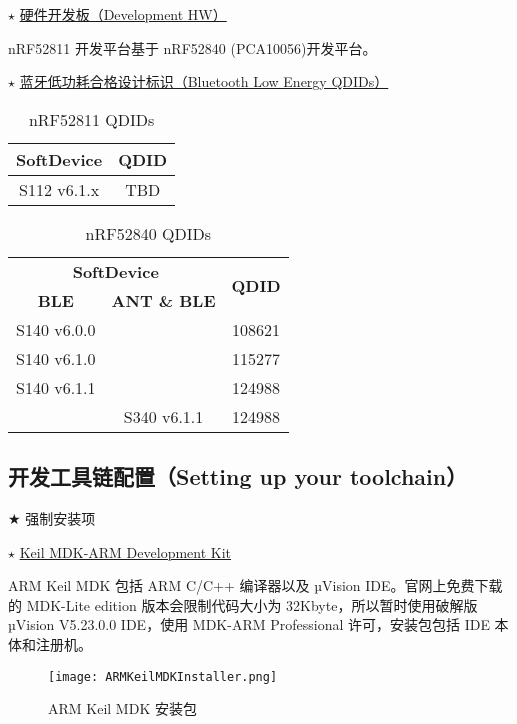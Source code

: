 \documentclass{WHUResearch}  %
\begin{document}
$\star$ \href{https://infocenter.nordicsemi.com/index.jsp?topic=\%2Fcomp_matrix_nrf52811\%2FCOMP\%2Fnrf52811\%2Fnrf52811_ble_qdid_qual_matrix.html&cp=3_2_2_4}{硬件开发板（Development HW）}

 nRF52811 开发平台基于 nRF52840 (PCA10056)开发平台。

$\star$ \href{https://infocenter.nordicsemi.com/index.jsp?topic=\%2Fcomp_matrix_nrf52811\%2FCOMP\%2Fnrf52811\%2Fnrf52811_ble_qdid_qual_matrix.html&cp=3_2_2_4}{蓝牙低功耗合格设计标识（Bluetooth Low Energy QDIDs）}
\begin{table}[htbp]
  \centering
  \caption{nRF52811 QDIDs}
	\begin{tabular}{|c|c|}
	\hline
  	\textbf{SoftDevice	} & \textbf{QDID} \\ \hline
  	S112 v6.1.x   	     & TBD \\ \hline
	\end{tabular}
\end{table}

\begin{table}[htbp]
  \centering
  \caption{nRF52840 QDIDs}
	\begin{tabular}{|c|c|c|}
	\hline
	\multicolumn{2}{|c|}{\textbf{SoftDevice}} & \multirow{2}{*}{\textbf{QDID}} \\ \cline{1-2}
  			 \textbf{BLE} & \textbf{ANT \& BLE} &                   \\ \hline
  			 S140 v6.0.0	& \multirow{3}{*}{}  & 108621 \\ \cline{1-1} \cline{3-3} 
  			 S140 v6.1.0	&                    & 115277 \\ \cline{1-1} \cline{3-3} 
  			 S140 v6.1.1	&                    & 124988 \\ \hline
  							& S340 v6.1.1 		  & 124988 \\ \hline
	\end{tabular}
\end{table}

\subsection{开发工具链配置（Setting up your toolchain）}

$\bigstar$ 强制安装项

$\star$ \href{http://www2.keil.com/mdk5/}{Keil MDK-ARM Development Kit}

ARM Keil MDK 包括 ARM C/C++ 编译器以及 µVision IDE。官网上免费下载的 MDK-Lite edition 版本会限制代码大小为 32Kbyte，所以暂时使用破解版µVision V5.23.0.0 IDE，使用 MDK-ARM Professional 许可，安装包包括 IDE 本体和注册机。
\begin{figure}[htbp]
\centering
  \texttt{[image: ARMKeilMDKInstaller.png]}
  \caption{ARM Keil MDK 安装包}
  \label{fig:ARMKeilMDKInstaller}
\end{figure}
\end{document}

